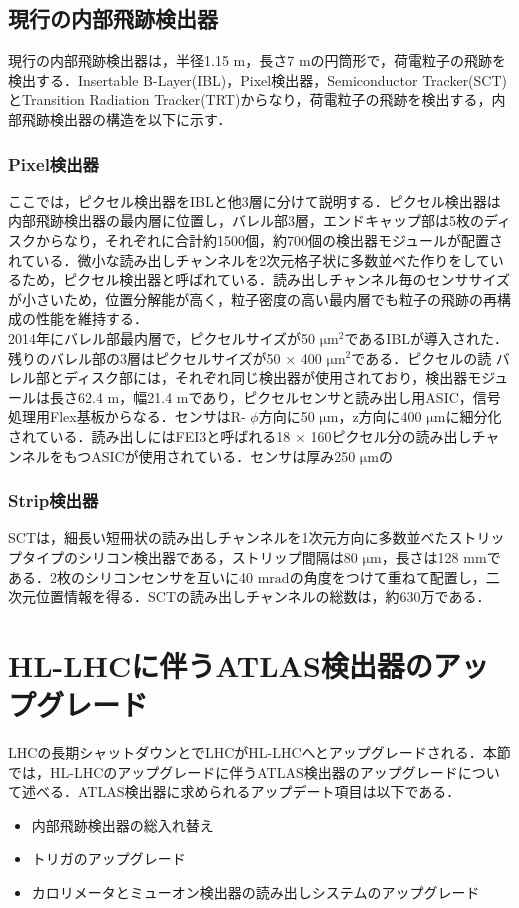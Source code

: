 \subsection{現行の内部飛跡検出器}
現行の内部飛跡検出器は，半径1.15 $\mathrm{m}$，長さ7 $\mathrm{m}$の円筒形で，荷電粒子の飛跡を検出する．Insertable B-Layer(IBL)，Pixel検出器，Semiconductor Tracker(SCT)とTransition Radiation Tracker(TRT)からなり，荷電粒子の飛跡を検出する，内部飛跡検出器の構造を以下に示す．

\subsubsection{Pixel検出器}
ここでは，ピクセル検出器をIBLと他3層に分けて説明する．ピクセル検出器は内部飛跡検出器の最内層に位置し，バレル部3層，エンドキャップ部は5枚のディスクからなり，それぞれに合計約1500個，約700個の検出器モジュールが配置されている．微小な読み出しチャンネルを2次元格子状に多数並べた作りをしているため，ピクセル検出器と呼ばれている．読み出しチャンネル毎のセンササイズが小さいため，位置分解能が高く，粒子密度の高い最内層でも粒子の飛跡の再構成の性能を維持する．\\
2014年にバレル部最内層で，ピクセルサイズが50 $\mathrm{\mu m^2}$であるIBLが導入された．残りのバレル部の3層はピクセルサイズが50 $\times$ 400 $\mathrm{\mu m^2}$である．ピクセルの読
バレル部とディスク部には，それぞれ同じ検出器が使用されており，検出器モジュールは長さ62.4 $\mathrm{m}$，幅21.4 $\mathrm{m}$であり，ピクセルセンサと読み出し用ASIC，信号処理用Flex基板からなる．センサはR- $\phi$方向に50 $\mathrm{\mu m}$，z方向に400 $\mathrm{\mu m}$に細分化されている．読み出しにはFEI3と呼ばれる18 $\times$ 160ピクセル分の読み出しチャンネルをもつASICが使用されている．センサは厚み250 $\mathrm{\mu m}$の

\subsubsection{Strip検出器}
SCTは，細長い短冊状の読み出しチャンネルを1次元方向に多数並べたストリップタイプのシリコン検出器である，ストリップ間隔は80 $\mathrm{\mu m}$，長さは128 $\mathrm{mm}$である．2枚のシリコンセンサを互いに40 $\mathrm{mrad}$の角度をつけて重ねて配置し，二次元位置情報を得る．SCTの読み出しチャンネルの総数は，約630万である．


\section{HL-LHCに伴うATLAS検出器のアップグレード}
LHCの長期シャットダウンとでLHCがHL-LHCへとアップグレードされる．本節では，HL-LHCのアップグレードに伴うATLAS検出器のアップグレードについて述べる．ATLAS検出器に求められるアップデート項目は以下である．
\begin{itemize}
\item 内部飛跡検出器の総入れ替え
\item トリガのアップグレード
\item カロリメータとミューオン検出器の読み出しシステムのアップグレード
\end{itemize}

